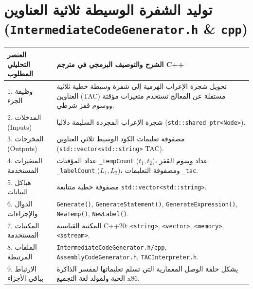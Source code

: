 \documentclass[11pt,a4paper,oneside]{report}
\begin{document}
\section{توليد الشفرة الوسيطة ثلاثية العناوين (\texttt{IntermediateCodeGenerator.h} \& \texttt{cpp})}
\begin{longtable}{|p{4.2cm}|p{12.2cm}|}
\hline
\rowcolor{NavyBlue}\color{white}\textbf{\arabicfont العنصر التحليلي المطلوب} & \rowcolor{NavyBlue}\color{white}\textbf{\arabicfont الشرح والتوصيف البرمجي في مترجم C++} \\
\hline
\endhead
1. وظيفة الجزء & تحويل شجرة الإعراب الهرمية إلى شفرة وسيطة خطية ثلاثية العناوين (TAC) مستقلة عن المعالج تستخدم متغيرات مؤقتة ووسوم قفز شرطي. \\
\hline
2. المدخلات (Inputs) & شجرة الإعراب المجردة السليمة دلاليا (\texttt{std::shared\_ptr<Node>}). \\
\hline
3. المخرجات (Outputs) & مصفوفة تعليمات الكود الوسيط ثلاثي العناوين (\texttt{std::vector<std::string>} TAC). \\
\hline
4. المتغيرات المستخدمة & عداد المؤقتات \texttt{\_tempCount} ($t_1, t_2$)، عداد وسوم القفز \texttt{\_labelCount} ($L_1, L_2$)، ومصفوفة التعليمات \texttt{\_tac}. \\
\hline
5. هياكل البيانات & مصفوفة خطية متتابعة \texttt{std::vector<std::string>}. \\
\hline
6. الدوال والإجراءات & \texttt{Generate()}, \texttt{GenerateStatement()}, \texttt{GenerateExpression()}, \texttt{NewTemp()}, \texttt{NewLabel()}. \\
\hline
7. المكتبات المستخدمة & المكتبة القياسية C++20: \texttt{<string>}, \texttt{<vector>}, \texttt{<memory>}, \texttt{<sstream>}. \\
\hline
8. الملفات المرتبطة & \texttt{IntermediateCodeGenerator.h/cpp}, \texttt{AssemblyCodeGenerator.h}, \texttt{TACInterpreter.h}. \\
\hline
9. الارتباط بباقي الأجزاء & يشكل حلقة الوصل المعمارية التي تسلم تعليماتها لمفسر الذاكرة الحية ولمولد لغة التجميع x86. \\
\hline
\end{longtable}
\end{document}
